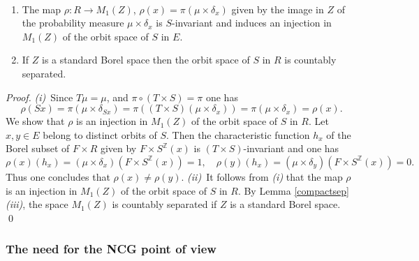 \documentclass[graybox, envcountsect%
]{svmult}
\def\Z{{\mathbb Z}}
\begin{document}
\begin{proposition}\label{measures} \
 \begin{enumerate}
\item[(i)] The map $\rho:R\to M_1(Z)$, $\rho(x)=\pi(\mu\times \delta_{x})$  given by the image in $Z$ of the probability measure $\mu\times \delta_x$ is $S$-invariant and induces an injection in $M_1(Z)$ of the orbit space of $S$ in $E$.	
\item[(ii)] If  $Z$ is a standard Borel space then the orbit space of $S$ in $R$ is countably separated. 
\end{enumerate}
\end{proposition}
\begin{proof} {\it (i)}~Since $T\mu=\mu$, and $ \pi\circ (T\times S)=\pi$ one has
$$
\rho(Sx)=\pi(\mu\times \delta_{Sx})=\pi((T\times S)(\mu\times \delta_{x}))=
\pi(\mu\times \delta_{x})=\rho(x).
$$
We show that $\rho$ is an injection in $M_1(Z)$ of the orbit space of $S$ in $R$. Let $x,y\in E$ belong to distinct orbits of $S$. Then the characteristic function $h_x$ of the  Borel subset of $F\times R$ given by $F\times S^\Z(x)$ is $(T\times S)$-invariant and one has 
$$
\rho(x)(h_x)=(\mu\times \delta_x)(F\times S^\Z(x))=1, \quad  
\rho(y)(h_x)=(\mu\times \delta_y)(F\times S^\Z(x))=0.
$$
 Thus one concludes that $\rho(x)\neq \rho(y)$.\newline
 {\it (ii)}~It follows from {\it (i)} that the map $\rho$ is an injection in $M_1(Z)$ of the orbit space of $S$ in $R$. By Lemma \ref{compactsep} {\it (iii)}, the space $M_1(Z)$ is countably separated if $Z$ is a standard Borel space. 
 \qed\end{proof} 
 
 \subsubsection{The need for the NCG point of view}\label{subsubsec:2.1.3}
 
\end{document}
